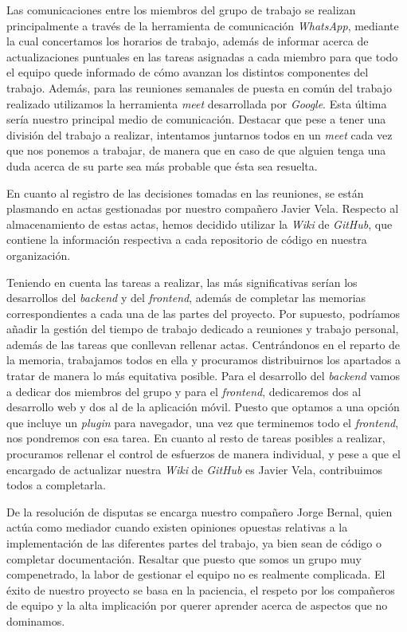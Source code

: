 \documentclass{article}
\begin{document}
Las comunicaciones entre los miembros del grupo de trabajo se realizan principalmente a través de la herramienta de comunicación \textit{WhatsApp}, mediante la cual concertamos los horarios de trabajo, además de informar acerca de actualizaciones puntuales en las tareas asignadas a cada miembro para que todo el equipo quede informado de cómo avanzan los distintos componentes del trabajo. Además, para las reuniones semanales de puesta en común del trabajo realizado utilizamos la herramienta \textit{meet} desarrollada por \textit{Google}. Esta última sería nuestro principal medio de comunicación. Destacar que pese a tener una división del trabajo a realizar, intentamos juntarnos todos en un \textit{meet} cada vez que nos ponemos a trabajar, de manera que en caso de que alguien tenga una duda acerca de su parte sea más probable que ésta sea resuelta.

En cuanto al registro de las decisiones tomadas en las reuniones, se están plasmando en actas gestionadas por nuestro compañero Javier Vela. Respecto al almacenamiento de estas actas, hemos decidido utilizar la \textit{Wiki} de \textit{GitHub}, que contiene la información respectiva a cada repositorio de código en nuestra organización.

Teniendo en cuenta las tareas a realizar, las más significativas serían los desarrollos del \textit{backend} y del \textit{frontend}, además de completar las memorias correspondientes a cada una de las partes del proyecto. Por supuesto, podríamos añadir la gestión del tiempo de trabajo dedicado a reuniones y trabajo personal, además de las tareas que conllevan rellenar actas. Centrándonos en el reparto de la memoria, trabajamos todos en ella y procuramos distribuirnos los apartados a tratar de manera lo más equitativa posible. Para el desarrollo del \textit{backend} vamos a dedicar dos miembros del grupo y para el \textit{frontend}, dedicaremos dos al desarrollo web y dos al de la aplicación móvil. Puesto que optamos a una opción que incluye un \textit{plugin} para navegador, una vez que terminemos todo el \textit{frontend}, nos pondremos con esa tarea. En cuanto al resto de tareas posibles a realizar, procuramos rellenar el control de esfuerzos de manera individual, y pese a que el encargado de actualizar nuestra \textit{Wiki} de \textit{GitHub} es Javier Vela, contribuimos todos a completarla.

De la resolución de disputas se encarga nuestro compañero Jorge Bernal, quien actúa como mediador cuando existen opiniones opuestas relativas a la implementación de las diferentes partes del trabajo, ya bien sean de código o completar documentación. Resaltar que puesto que somos un grupo muy compenetrado, la labor de gestionar el equipo no es realmente complicada. El éxito de nuestro proyecto se basa en la paciencia, el respeto por los compañeros de equipo y la alta implicación por querer aprender acerca de aspectos que no dominamos.
\end{document}
